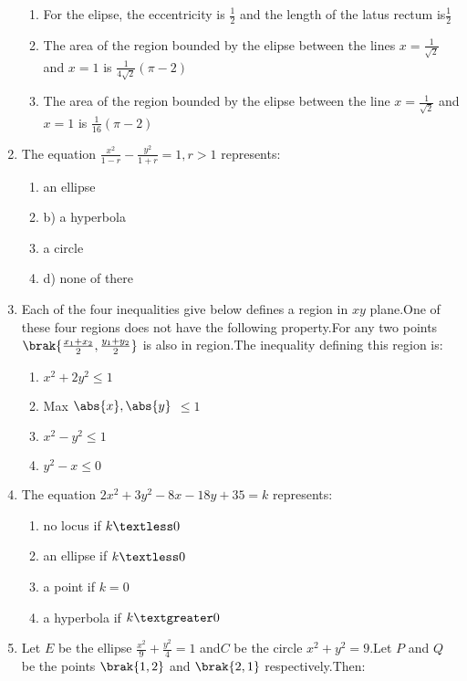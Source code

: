 \begin{enumerate}
\begin{enumerate}
		      \item For the elipse, the eccentricity is $\frac{1}{2}$ and the length of the latus rectum is$\frac{1}{2}$
		      \item The area of the region bounded by the elipse between the lines $x=\frac{1}{\sqrt{2}}$ and $x=1$ is $\frac{1}{4\sqrt{2}}(\pi-2)$
		      \item The area of the region bounded by the elipse between the line $x=\frac{1}{\sqrt{2}}$ and $x=1$ is $\frac{1}{16}(\pi-2)$
	       \end{enumerate}
    \item The equation $\frac{x^2}{1-r}-\frac{y^2}{1+r}=1,r > 1$
represents:
          \hfill  {}
\begin{enumerate}
    \item an ellipse    \item      b)   a hyperbola
   \item a circle     \item   d) none of there 
\end{enumerate}
\item Each of the four inequalities give below defines a region in $xy$ plane.One of these four regions does not have the following property.For any two points   $\brak{\frac{x_1+x_2}{2},\frac{y_1+y_2}{2}}$   is also in region.The inequality defining this region is:
         \hfill {}
\begin{enumerate}
    \item $x^2+2y^2\le1$
    \item Max $\abs{x},\abs{y}$ $\le1$
    \item $x^2-y^2\le1$
    \item $y^2-x\le0$
\end{enumerate}
\item The equation $2x^2+3y^2-8x-18y+35=k$ represents:
        \hfill {}
\begin{enumerate}
    \item no locus if $k\textless0$
    \item an ellipse if $k\textless0$
    \item a point if $k=0$
    \item a hyperbola if $k\textgreater0$ 
\end{enumerate}
\item Let $E$ be the ellipse $\frac{x^2}{9}+\frac{y^2}{4}=1$ and$C$ be the circle $x^2+y^2=9$.Let $P$ and $Q$ be the points $\brak{1,2}$ and $\brak{2,1}$ respectively.Then: 
        \hfill {}

\end{enumerate}
